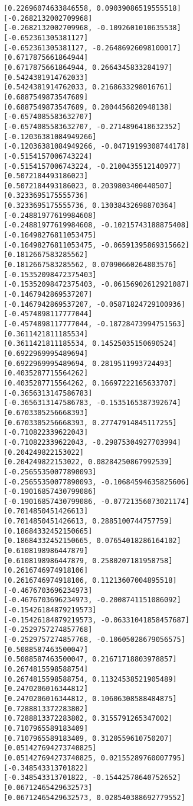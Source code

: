 \documentclass[11pt]{article}
\begin{document}
\begin{Verbatim}[commandchars=\\\{\}]
[0.22696074633846558, 0.09039086519555518]
[-0.2682132002709968]
[-0.2682132002709968, -0.1092601010635538]
[-0.652361305381127]
[-0.652361305381127, -0.26486926098100017]
[0.6717875661864944]
[0.6717875661864944, 0.2664345833284197]
[0.5424381914762033]
[0.5424381914762033, 0.2168633298016761]
[0.6887549873547689]
[0.6887549873547689, 0.2804456820948138]
[-0.6574085583632707]
[-0.6574085583632707, -0.2714896418632352]
[-0.12036381084949266]
[-0.12036381084949266, -0.04719199308744178]
[-0.5154157006743224]
[-0.5154157006743224, -0.2100435512140977]
[0.5072184493186023]
[0.5072184493186023, 0.2039803400440507]
[0.3233695175555736]
[0.3233695175555736, 0.13038432698870364]
[-0.24881977619984608]
[-0.24881977619984608, -0.10215743188875408]
[-0.16498276811053475]
[-0.16498276811053475, -0.06591395869315662]
[0.1812667583285562]
[0.1812667583285562, 0.07090660264803576]
[-0.15352098472375403]
[-0.15352098472375403, -0.06156902612921087]
[-0.1467942869537207]
[-0.1467942869537207, -0.05871824729100936]
[-0.4574898117777044]
[-0.4574898117777044, -0.18728473994751563]
[0.3611421811185534]
[0.3611421811185534, 0.14525035150690524]
[0.6922969995489694]
[0.6922969995489694, 0.2819511993724493]
[0.4035287715564262]
[0.4035287715564262, 0.16697222165633707]
[-0.3656313147586783]
[-0.3656313147586783, -0.1535165387392674]
[0.6703305256668393]
[0.6703305256668393, 0.27747914845117255]
[-0.710822339622043]
[-0.710822339622043, -0.29875304927703994]
[0.204249822153022]
[0.204249822153022, 0.08284250867992539]
[-0.25655350077890093]
[-0.25655350077890093, -0.10684594635825606]
[-0.19016857430799086]
[-0.19016857430799086, -0.07721356073021174]
[0.7014850451426613]
[0.7014850451426613, 0.2885100744757759]
[0.18684332452150665]
[0.18684332452150665, 0.07654018286164102]
[0.6108198986447879]
[0.6108198986447879, 0.2580207181958758]
[0.2616746974918106]
[0.2616746974918106, 0.11213607004895518]
[-0.4676703696234973]
[-0.4676703696234973, -0.2008741151086092]
[-0.15426184879219573]
[-0.15426184879219573, -0.06331041858457687]
[-0.2529757274857768]
[-0.2529757274857768, -0.10605028679056575]
[0.5088587463500047]
[0.5088587463500047, 0.21671718803978857]
[0.2674815598588754]
[0.2674815598588754, 0.11324538521905489]
[0.2470206016344812]
[0.2470206016344812, 0.10606308588484875]
[0.7288813372283802]
[0.7288813372283802, 0.3155791265347002]
[0.7107965589183409]
[0.7107965589183409, 0.3120559610750207]
[0.051427694273740825]
[0.051427694273740825, 0.02155289760007795]
[-0.348543313701822]
[-0.348543313701822, -0.15442578640752652]
[0.06712465429632573]
[0.06712465429632573, 0.028540388692779552]

\end{Verbatim}
\end{document}
